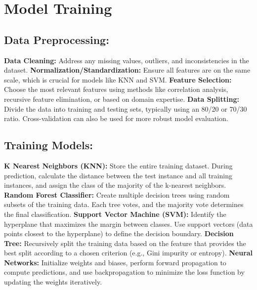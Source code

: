 \documentclass[a4paper,12pt]{report}
\begin{document}
    \section{Model Training}

\subsection{Data Preprocessing:}

         \textbf{Data Cleaning:} Address any missing values, outliers, and inconsistencies in the dataset.
        \newline \textbf{Normalization/Standardization:} Ensure all features are on the same scale, which is crucial for models like KNN and SVM.
        \newline \textbf{Feature Selection:} Choose the most relevant features using methods like correlation analysis, recursive feature elimination, or based on domain expertise.
        \newline \textbf{Data Splitting:} Divide the data into training and testing sets, typically using an 80/20 or 70/30 ratio. Cross-validation can also be used for more robust model evaluation.
  

    \subsection{Training Models:}

\textbf{K Nearest Neighbors (KNN):} Store the entire training dataset. During prediction, calculate the distance between the test instance and all training instances, and assign the class of the majority of the k-nearest neighbors.
{}
\newline \textbf{Random Forest Classifier:} Create multiple decision trees using random subsets of the training data. Each tree votes, and the majority vote determines the final classification.
{}
 \newline \textbf{Support Vector Machine (SVM):} Identify the hyperplane that maximizes the margin between classes. Use support vectors (data points closest to the hyperplane) to define the decision boundary.
{}      
\newline\textbf{Decision Tree:} Recursively split the training data based on the feature that provides the best split according to a chosen criterion (e.g., Gini impurity or entropy).
{}    
\newline\textbf{Neural Networks:} Initialize weights and biases, perform forward propagation to compute predictions, and use backpropagation to minimize the loss function by updating the weights iteratively.
\end{document}
